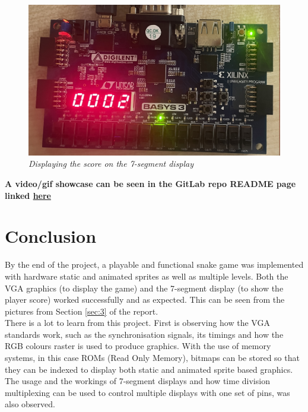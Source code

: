\documentclass[aps, secnumarabic, balancelastpage, asmath, amssymb, nofootinbib, floatfix,]{revtex4-2}
\begin{document}
{\clearpage

\begin{figure}[h]
  \centering
  \includegraphics[scale = 0.6]{score.jpg}
  \caption{\em Displaying the score on the 7-segment display}
  \label{fig:20}
\end{figure}

{\large \bf A video/gif showcase can be seen in the GitLab repo README page linked \href{https://cseegit.essex.ac.uk/23-24-ce339/23-24_CE339_gopinath_akshay/-/tree/master/assignment_2}{here}}


\clearpage

\section{\fontsize{11.3pt}{12pt}\selectfont \bf Conclusion}
\fontsize{11pt}{12pt}\selectfont \label{sec:4}


By the end of the project, a playable and functional snake game was implemented with hardware static and animated sprites as well as multiple levels. Both the VGA graphics (to display the game) and the 7-segment display (to show the player score) worked successfully and as expected. This can be seen from the pictures from Section \ref{sec:3} of the report.~\\

There is a lot to learn from this project. First is observing how the VGA standards work, such as the synchronisation signals, its timings and how the RGB colours raster is used to produce graphics. With the use of memory systems, in this case ROMs (Read Only Memory), bitmaps can be stored so that they can be indexed to display both static and animated sprite based graphics. The usage and the workings of 7-segment displays and how time division multiplexing can be used to control multiple displays with one set of pins, was also observed. ~\\


}
\end{document}
